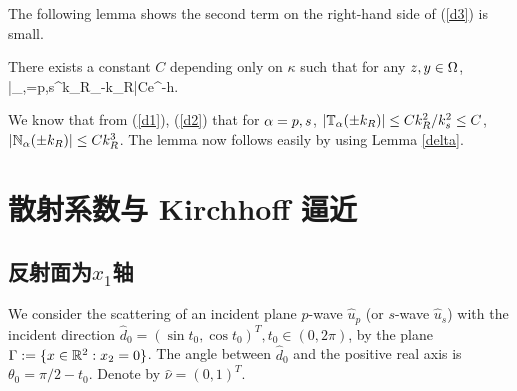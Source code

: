 The following lemma shows the second term on the right-hand side of (\ref{d3}) is small.

\begin{lem}\label{lem:3.2}
	There exists a constant $C$ depending only on $\kappa$ such that for any $z,y\in\Omega$,
	\ben
	\left|\sum_{\al,\beta=p,s}^{k_R}_{-k_R}\right|\le \frac C\mu e^{-h}.
	\een
\end{lem}
\debproof
We know that from (\ref{d1}), (\ref{d2}) that for $\alpha=p,s$, $|\mathbb{T}_\alpha(\pm k_R)|\le Ck_R^2/k_s^2\le C$, $|\mathbb{N}_\alpha(\pm k_R)|\le Ck_R^3$. The lemma now follows easily by using Lemma \ref{delta}. 
\finproof




























\section{散射系数与 Kirchhoff 逼近}

\subsection{反射面为$x_1$轴}

We consider the scattering of an incident plane $p$-wave  $\hat u_p$ (or $s$-wave $\hat u_s$) with the incident direction $\hat d_0=(\sin t_0, \cos t_0)^T, t_0\in (0,2\pi)$, by the plane $\Gamma := \{x \in \mathbb{R}^2 :x _2 = 0\}$. 
The angle between $\hat d_0$ and the positive real axis is $\theta_0=\pi/2-t_0$. Denote by $\hat\nu=(0,1)^T$.

